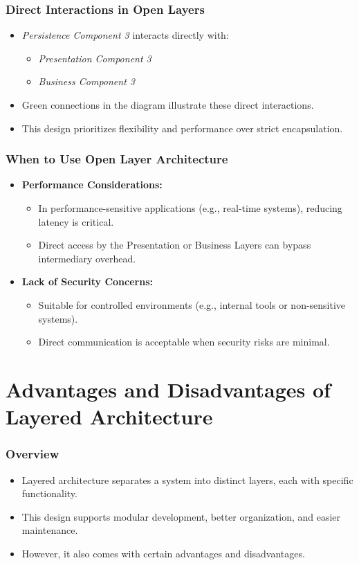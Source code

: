 \documentclass[aspectratio=169, table]{beamer}
\begin{document}
\begin{frame}
	\frametitle{Direct Interactions in Open Layers}
	\begin{itemize}
		\item \textit{Persistence Component 3} interacts directly with:
		\begin{itemize}
			\item \textit{Presentation Component 3}
			\item \textit{Business Component 3}
		\end{itemize}
		\item Green connections in the diagram illustrate these direct interactions.
		\item This design prioritizes flexibility and performance over strict encapsulation.
	\end{itemize}
\end{frame}

\begin{frame}
	\frametitle{When to Use Open Layer Architecture}
	\begin{itemize}
		\item \textbf{Performance Considerations:}
		\begin{itemize}
			\item In performance-sensitive applications (e.g., real-time systems), reducing latency is critical.
			\item Direct access by the Presentation or Business Layers can bypass intermediary overhead.
		\end{itemize}
		\item \textbf{Lack of Security Concerns:}
		\begin{itemize}
			\item Suitable for controlled environments (e.g., internal tools or non-sensitive systems).
			\item Direct communication is acceptable when security risks are minimal.
		\end{itemize}
	\end{itemize}
\end{frame}

\section{Advantages and Disadvantages of Layered Architecture}

\begin{frame}
	\frametitle{Overview}
	\begin{itemize}
		\item Layered architecture separates a system into distinct layers, each with specific functionality.
		\item This design supports modular development, better organization, and easier maintenance.
		\item However, it also comes with certain advantages and disadvantages.
	\end{itemize}
\end{frame}
\end{document}
